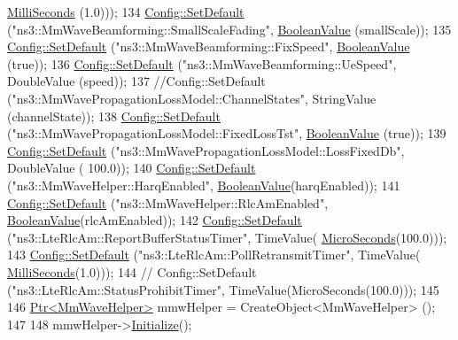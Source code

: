 \begin{DoxyCode}
      \hyperlink{group__timecivil_gaf26127cf4571146b83a92ee18679c7a9}{MilliSeconds} (1.0)));
134         \hyperlink{group__config_ga2e7882df849d8ba4aaad31c934c40c06}{Config::SetDefault} (\textcolor{stringliteral}{"ns3::MmWaveBeamforming::SmallScaleFading"}, 
      \hyperlink{classns3_1_1BooleanValue}{BooleanValue} (smallScale));
135         \hyperlink{group__config_ga2e7882df849d8ba4aaad31c934c40c06}{Config::SetDefault} (\textcolor{stringliteral}{"ns3::MmWaveBeamforming::FixSpeed"}, 
      \hyperlink{classns3_1_1BooleanValue}{BooleanValue} (\textcolor{keyword}{true}));
136         \hyperlink{group__config_ga2e7882df849d8ba4aaad31c934c40c06}{Config::SetDefault} (\textcolor{stringliteral}{"ns3::MmWaveBeamforming::UeSpeed"}, DoubleValue (speed));
137         \textcolor{comment}{//Config::SetDefault ("ns3::MmWavePropagationLossModel::ChannelStates", StringValue
       (channelState));}
138         \hyperlink{group__config_ga2e7882df849d8ba4aaad31c934c40c06}{Config::SetDefault} (\textcolor{stringliteral}{"ns3::MmWavePropagationLossModel::FixedLossTst"}, 
      \hyperlink{classns3_1_1BooleanValue}{BooleanValue} (\textcolor{keyword}{true}));
139         \hyperlink{group__config_ga2e7882df849d8ba4aaad31c934c40c06}{Config::SetDefault} (\textcolor{stringliteral}{"ns3::MmWavePropagationLossModel::LossFixedDb"}, DoubleValue (
      100.0));
140         \hyperlink{group__config_ga2e7882df849d8ba4aaad31c934c40c06}{Config::SetDefault} (\textcolor{stringliteral}{"ns3::MmWaveHelper::HarqEnabled"}, 
      \hyperlink{classns3_1_1BooleanValue}{BooleanValue}(harqEnabled));
141         \hyperlink{group__config_ga2e7882df849d8ba4aaad31c934c40c06}{Config::SetDefault} (\textcolor{stringliteral}{"ns3::MmWaveHelper::RlcAmEnabled"}, 
      \hyperlink{classns3_1_1BooleanValue}{BooleanValue}(rlcAmEnabled));
142         \hyperlink{group__config_ga2e7882df849d8ba4aaad31c934c40c06}{Config::SetDefault} (\textcolor{stringliteral}{"ns3::LteRlcAm::ReportBufferStatusTimer"}, TimeValue(
      \hyperlink{group__timecivil_ga17465a639c8d1464e76538afdd78a9f0}{MicroSeconds}(100.0)));
143         \hyperlink{group__config_ga2e7882df849d8ba4aaad31c934c40c06}{Config::SetDefault} (\textcolor{stringliteral}{"ns3::LteRlcAm::PollRetransmitTimer"}, TimeValue(
      \hyperlink{group__timecivil_gaf26127cf4571146b83a92ee18679c7a9}{MilliSeconds}(1.0)));
144 \textcolor{comment}{//      Config::SetDefault ("ns3::LteRlcAm::StatusProhibitTimer", TimeValue(MicroSeconds(100.0)));}
145 
146   \hyperlink{classns3_1_1Ptr}{Ptr<MmWaveHelper>} mmwHelper = CreateObject<MmWaveHelper> ();
147 
148   mmwHelper->\hyperlink{classns3_1_1Object_af4411cb29971772fcd09203474a95078}{Initialize}();

\end{DoxyCode}
